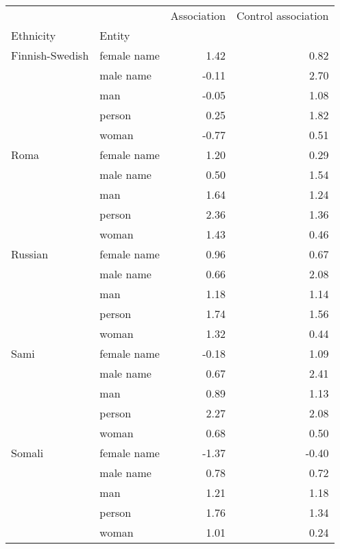 \begin{tabular}{llrr}
\toprule
       &       &  Association &  Control association \\
Ethnicity & Entity &              &                      \\
\midrule
Finnish-Swedish & female name &         1.42 &                 0.82 \\
       & male name &        -0.11 &                 2.70 \\
       & man &        -0.05 &                 1.08 \\
       & person &         0.25 &                 1.82 \\
       & woman &        -0.77 &                 0.51 \\
Roma & female name &         1.20 &                 0.29 \\
       & male name &         0.50 &                 1.54 \\
       & man &         1.64 &                 1.24 \\
       & person &         2.36 &                 1.36 \\
       & woman &         1.43 &                 0.46 \\
Russian & female name &         0.96 &                 0.67 \\
       & male name &         0.66 &                 2.08 \\
       & man &         1.18 &                 1.14 \\
       & person &         1.74 &                 1.56 \\
       & woman &         1.32 &                 0.44 \\
Sami & female name &        -0.18 &                 1.09 \\
       & male name &         0.67 &                 2.41 \\
       & man &         0.89 &                 1.13 \\
       & person &         2.27 &                 2.08 \\
       & woman &         0.68 &                 0.50 \\
Somali & female name &        -1.37 &                -0.40 \\
       & male name &         0.78 &                 0.72 \\
       & man &         1.21 &                 1.18 \\
       & person &         1.76 &                 1.34 \\
       & woman &         1.01 &                 0.24 \\
\bottomrule
\end{tabular}
